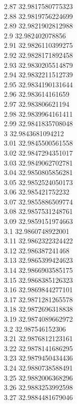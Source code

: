{2.87	32.9817580775323\\
2.88	32.9819756224699\\
2.89	32.9821902812988\\
2.9	32.982402078856\\
2.91	32.9826110399275\\
2.92	32.9828171892458\\
2.93	32.9830205514879\\
2.94	32.9832211512739\\
2.95	32.9834190131644\\
2.96	32.983614161659\\
2.97	32.983806621194\\
2.98	32.9839964161411\\
2.99	32.9841835708048\\
3	32.9843681094212\\
3.01	32.9845500561558\\
3.02	32.9847294351017\\
3.03	32.9849062702781\\
3.04	32.9850805856281\\
3.05	32.9852524050173\\
3.06	32.985421752232\\
3.07	32.9855886509774\\
3.08	32.9857531248761\\
3.09	32.9859151974663\\
3.1	32.9860748922001\\
3.11	32.9862322324422\\
3.12	32.986387241468\\
3.13	32.9865399424623\\
3.14	32.9866903585175\\
3.15	32.9868385126323\\
3.16	32.9869844277101\\
3.17	32.9871281265578\\
3.18	32.9872696318838\\
3.19	32.9874089662972\\
3.2	32.987546152306\\
3.21	32.9876812123161\\
3.22	32.9878141686295\\
3.23	32.9879450434436\\
3.24	32.9880738588491\\
3.25	32.9882006368296\\
3.26	32.9883253992598\\
3.27	32.9884481679046\\
}
